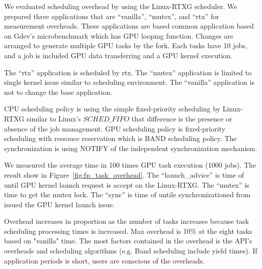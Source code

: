 We evaluated scheduling overhead by using the Linux-RTXG scheduler.
We prepared three applications that are ``vanilla'', ``mutex'', and ``rtx'' for measurement overheads.
These applications are based common application based on Gdev's microbenchmark which has GPU looping function.
Changes are arranged to generate multiple GPU tasks by the fork.
Each tasks have 10 jobs, and a job is included GPU data transferring and a GPU kernel execution.

The ``rtx'' application is scheduled by rtx.
The ``mutex'' application  is limited to single kernel issue similar to scheduling environment.
The ``vanilla'' application is not to change the base application.

CPU scheduling policy is using the simple fixed-priority scheduling by Linux-RTXG similar to Linux's $SCHED\_FIFO$ that difference is the presence or absence of the job management.
GPU scheduling policy is fixed-priority scheduling with resrouce reservation which is BAND scheduling policy.
The synchronization is using NOTIFY of the independent synchronization mechanism.

We measured the average time in 100 times GPU task execution (1000 jobs).
The result show in Figure~\ref{fig:fp_task_overhead}.
The ``launch\_advice'' is time of until GPU kernel launch request is accept on the Linux-RTXG.
The ``mutex'' is time to get the mutex lock.
The ``sync'' is time of untile synchronizationed from issued the GPU kernel launch issue.

Overhead increases in proportion as the number of tasks increases because task scheduling processing times is increased.
Max overhead is 10\% at the eight tasks based on "vanilla" time.
The most factors contained in the overhead is the API's overheads and scheduling algorithms (e.g. Band scheduling include yield times).
If application periods is short, users are conscious of the overheads.


